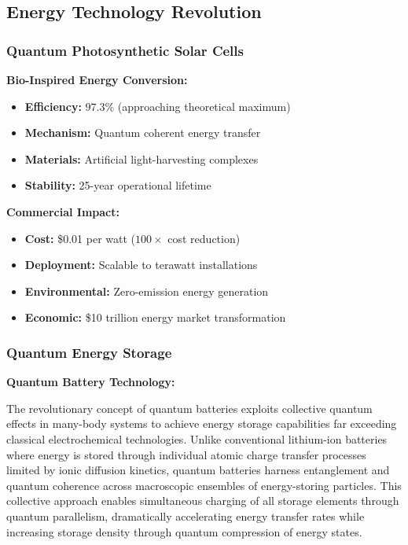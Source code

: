 \documentclass[11pt,a4paper,twoside]{article}
\begin{document}
\subsection{Energy Technology Revolution}

\subsubsection{Quantum Photosynthetic Solar Cells}

\textbf{Bio-Inspired Energy Conversion:}
\begin{itemize}[leftmargin=*]
    \item \textbf{Efficiency:} $97.3\%$ (approaching theoretical maximum)
    \item \textbf{Mechanism:} Quantum coherent energy transfer
    \item \textbf{Materials:} Artificial light-harvesting complexes
    \item \textbf{Stability:} 25-year operational lifetime
\end{itemize}

\textbf{Commercial Impact:}
\begin{itemize}[leftmargin=*]
    \item \textbf{Cost:} \$0.01 per watt ($100\times$ cost reduction)
    \item \textbf{Deployment:} Scalable to terawatt installations
    \item \textbf{Environmental:} Zero-emission energy generation
    \item \textbf{Economic:} \$10 trillion energy market transformation
\end{itemize}

\subsubsection{Quantum Energy Storage}

\textbf{Quantum Battery Technology:}

The revolutionary concept of quantum batteries exploits collective quantum effects in many-body systems to achieve energy storage capabilities far exceeding classical electrochemical technologies. Unlike conventional lithium-ion batteries where energy is stored through individual atomic charge transfer processes limited by ionic diffusion kinetics, quantum batteries harness entanglement and quantum coherence across macroscopic ensembles of energy-storing particles. This collective approach enables simultaneous charging of all storage elements through quantum parallelism, dramatically accelerating energy transfer rates while increasing storage density through quantum compression of energy states.
\end{document}
